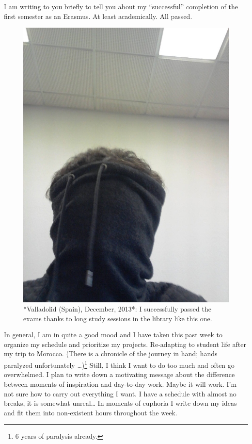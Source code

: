 \documentclass[]{book}
\let\rmarkdownfootnote\footnote%
\def\footnote{\protect\rmarkdownfootnote}
\begin{document}
I am writing to you briefly to tell you about my ``successful'' completion of the first semester as an Erasmus. At least academically. All passed.

\begin{figure}

{\centering \includegraphics[width=0.75\linewidth]{images/2014/study} 

}

\caption{*Valladolid (Spain), December, 2013*: I successfully passed the exams thanks to long study sessions in the library like this one.}\label{fig:study}
\end{figure}

In general, I am in quite a good mood and I have taken this past week to organize my schedule and prioritize my projects. Re-adapting to student life after my trip to Morocco. (There is a chronicle of the journey in hand; hands paralyzed unfortunately \ldots)\footnote{6 years of paralysis already.} Still, I think I want to do too much and often go overwhelmed. I plan to write down a motivating message about the difference between moments of inspiration and day-to-day work. Maybe it will work. I'm not sure how to carry out everything I want. I have a schedule with almost no breaks, it is somewhat unreal\ldots{} In moments of euphoria I write down my ideas and fit them into non-existent hours throughout the week.
\end{document}
